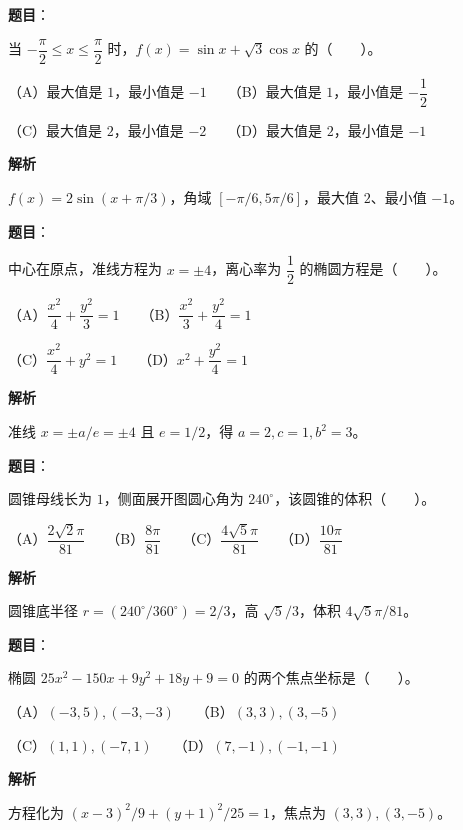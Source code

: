 \begin{answer}

\textbf{题目}：

当 $-\dfrac{\pi}{2}\le x\le\dfrac{\pi}{2}$ 时，$f(x)=\sin x+\sqrt{3}\cos x$ 的\mbox{（　　）}。

（A）最大值是 $1$，最小值是 $-1$　　（B）最大值是 $1$，最小值是 $-\dfrac12$

（C）最大值是 $2$，最小值是 $-2$　　（D）最大值是 $2$，最小值是 $-1$

\textbf{解析}

$f(x)=2\sin(x+\pi/3)$，角域 $[-\pi/6,5\pi/6]$，最大值 $2$、最小值 $-1$。


\end{answer}
\begin{answer}

\textbf{题目}：

中心在原点，准线方程为 $x=\pm4$，离心率为 $\dfrac12$ 的椭圆方程是\mbox{（　　）}。

（A）$\dfrac{x^2}{4}+\dfrac{y^2}{3}=1$　　（B）$\dfrac{x^2}{3}+\dfrac{y^2}{4}=1$

（C）$\dfrac{x^2}{4}+y^2=1$　　（D）$x^2+\dfrac{y^2}{4}=1$

\textbf{解析}

准线 $x=\pm a/e=\pm4$ 且 $e=1/2$，得 $a=2,c=1,b^2=3$。


\end{answer}
\begin{answer}

\textbf{题目}：

圆锥母线长为 $1$，侧面展开图圆心角为 $240^\circ$，该圆锥的体积\mbox{（　　）}。

（A）$\dfrac{2\sqrt{2}\pi}{81}$　　（B）$\dfrac{8\pi}{81}$　　（C）$\dfrac{4\sqrt{5}\pi}{81}$　　（D）$\dfrac{10\pi}{81}$

\textbf{解析}

圆锥底半径 $r=(240^\circ/360^\circ)=2/3$，高 $\sqrt5/3$，体积 $4\sqrt5\pi/81$。


\end{answer}
\begin{answer}

\textbf{题目}：

椭圆 $25x^2-150x+9y^2+18y+9=0$ 的两个焦点坐标是\mbox{（　　）}。

（A）$(-3,5),(-3,-3)$　　（B）$(3,3),(3,-5)$

（C）$(1,1),(-7,1)$　　（D）$(7,-1),(-1,-1)$

\textbf{解析}

方程化为 $(x-3)^2/9+(y+1)^2/25=1$，焦点为 $(3,3),(3,-5)$。


\end{answer}
